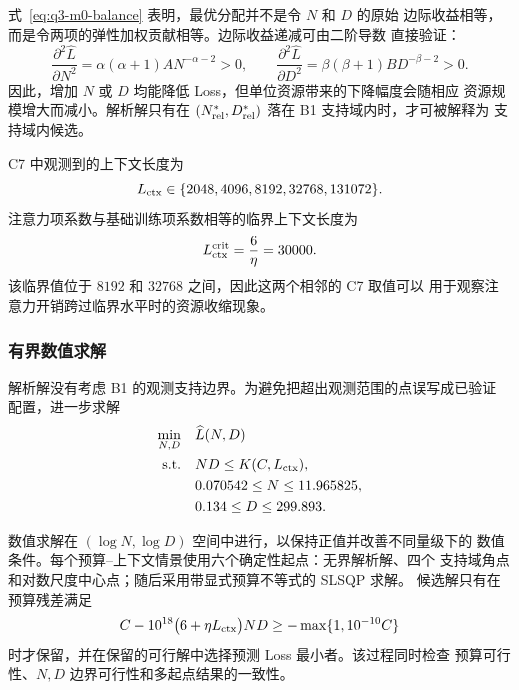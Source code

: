 式~\eqref{eq:q3-m0-balance} 表明，最优分配并不是令 $N$ 和 $D$ 的原始
边际收益相等，而是令两项的弹性加权贡献相等。边际收益递减可由二阶导数
直接验证：
\begin{equation}
\frac{\partial^2\widehat L}{\partial N^2}
=\alpha(\alpha+1)A N^{-\alpha-2}>0,\qquad
\frac{\partial^2\widehat L}{\partial D^2}
=\beta(\beta+1)B D^{-\beta-2}>0 .
\label{eq:q3-m0-diminishing-return}
\end{equation}
因此，增加 $N$ 或 $D$ 均能降低 Loss，但单位资源带来的下降幅度会随相应
资源规模增大而减小。解析解只有在
$(N_{\rm rel}^{*},D_{\rm rel}^{*})$ 落在 B1 支持域内时，才可被解释为
支持域内候选。

C7 中观测到的上下文长度为
\[
L_{\rm ctx}\in\{2048,4096,8192,32768,131072\}.
\]
注意力项系数与基础训练项系数相等的临界上下文长度为
\begin{equation}
L_{\rm ctx}^{\rm crit}=\frac{6}{\eta}=30000.
\label{eq:q3-m0-critical-context}
\end{equation}
该临界值位于 $8192$ 和 $32768$ 之间，因此这两个相邻的 C7 取值可以
用于观察注意力开销跨过临界水平时的资源收缩现象。

\subsubsection{有界数值求解}
\label{sec:q3-m0-nd-bounded}

解析解没有考虑 B1 的观测支持边界。为避免把超出观测范围的点误写成已验证
配置，进一步求解
\begin{equation}
\begin{aligned}
\min_{N,D}\quad &\widehat L(N,D)\\
\mathrm{s.t.}\quad
&ND\le K(C,L_{\rm ctx}),\\
&0.070542\le N\le11.965825,\\
&0.134\le D\le299.893 .
\end{aligned}
\label{eq:q3-m0-bounded-problem}
\end{equation}

数值求解在 $(\log N,\log D)$ 空间中进行，以保持正值并改善不同量级下的
数值条件。每个预算--上下文情景使用六个确定性起点：无界解析解、四个
支持域角点和对数尺度中心点；随后采用带显式预算不等式的 SLSQP 求解。
候选解只有在预算残差满足
\begin{equation}
C-10^{18}\bigl(6+\eta L_{\rm ctx}\bigr)ND
\ge -\max\{1,10^{-10}C\}
\label{eq:q3-m0-feasibility}
\end{equation}
时才保留，并在保留的可行解中选择预测 Loss 最小者。该过程同时检查
预算可行性、$N,D$ 边界可行性和多起点结果的一致性。

